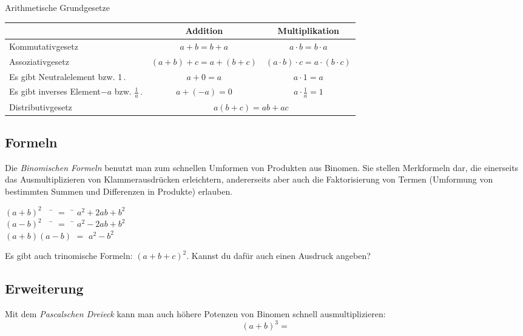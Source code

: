 \begin{law}{Arithmetische Grundgesetze}
    \bgroup
    \def\arraystretch{2.5}
	\begin{tabularx}{\linewidth}{|X|c|c|}
			\hline
			 & Addition & Multiplikation \\
			\hline
			Kommutativgesetz & $a+b=b+a$ & $a\cdot b = b\cdot a$ \\
			
			Assoziativgesetz & $(a+b)+c = a+ (b+c)$ & $(a\cdot b)\cdot c = a\cdot (b\cdot c)$ \\
			
			Es gibt Neutralelement\newline 0 bzw. 1\,. & $a+0 = a$ & $a\cdot 1 = a$ \\
			
			Es gibt inverses Element\newline $-a$ bzw. $\displaystyle \frac{1}{a}$\,. & $a+(-a) = 0$ & $\displaystyle a\cdot \frac{1}{a} = 1$ \\
			\hline
			Distributivgesetz & \multicolumn{2}{c|}{$a(b+c)=ab+ac$} \\
			\hline
    \end{tabularx}
    \egroup
\end{law}

\subsection*{Formeln}
Die \emph{Binomischen Formeln} benutzt man zum schnellen Umformen von Produkten aus Binomen.
Sie stellen Merkformeln dar, die einerseits das Ausmultiplizieren von Klammerausdrücken erleichtern, andererseits aber auch die Faktorisierung von Termen (Umformung von bestimmten Summen und Differenzen in Produkte) erlauben.

\begin{tcolorbox}[colback=blue!7!white,colframe=blue!60!black,title=Binomische Formeln]
	\begin{tabbing}
		$(a+b)^2$ \qquad \, \, \= $=$ \, \= $a^2+2ab+b^2$ \\
		$(a-b)^2$ \qquad \, \, \= $=$ \, \= $a^2-2ab+b^2$ \\
		$(a+b)(a-b)$ \> $=$ \> $a^2-b^2$
	\end{tabbing}
\end{tcolorbox} 

Es gibt auch trinomische Formeln: $(a+b+c)^2$. Kannst du dafür auch einen Ausdruck angeben?
\vspace{2cm}

\subsection*{Erweiterung}
Mit dem \emph{Pascalschen Dreieck} kann man auch höhere Potenzen von Binomen schnell ausmultiplizieren:
\[
	(a+b)^3 =
\]





